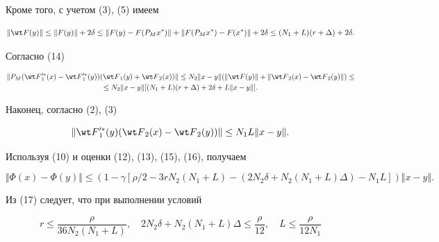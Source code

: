 Кроме того, с учетом (3), (5) имеем


\begin{equation}


\Vert {\wt F}(y) \Vert \leq \Vert F(y) \Vert+ 2\delta \leq


\Vert F(y)- F(P_M x^*) \Vert +


\Vert F(P_M x^*)-F(x^*) \Vert+


2\delta \leq (N_1+L)(r+\Delta)+ 2 \delta.


\end{equation}


Согласно (14)


\begin{multline}


\Vert P_M ({\wt F}{}_1^{\prime *}(x)- {\wt F}{}_1^{\prime *}(y))


({\wt F}_1 (y)+ {\wt F}_2 (x))\Vert \leq


N_2 \Vert x-y \Vert (\Vert {\wt F}(y) \Vert+


\Vert {\wt F}_2 (x) -{\wt F}_2 (y) \Vert) \leq \\


%


\leq N_2 \Vert x-y \Vert


[(N_1+L) (r+\Delta) + 2\delta+ L \Vert x-y \Vert].


\end{multline}


Наконец, согласно (2), (3)


\begin{equation}


\Vert{\wt F}{}_1^{\prime *}(y)


({\wt F}_2 (x)-{\wt F}_2 (y))


\Vert \leq N_1 L \Vert x-y \Vert.


\end{equation}


Используя (10) и оценки (12), (13), (15), (16), получаем


\begin{equation}


\Vert \Phi(x)- \Phi(y) \Vert \leq


(1-\gamma [\rho/2- 3 r N_2 (N_1 +L) -


(2 N_2 \delta + N_2 (N_1 + L) \Delta)-N_1 L]) \Vert x-y\Vert.


\end{equation}


Из (17) следует, что при выполнении условий


\begin{equation}


r \leq \frac{\rho}{36 N_2 (N_1 + L)}, \quad


2 N_2 \delta + N_2 (N_1+L) \Delta \leq \frac{\rho}{12},


\quad L\leq \frac{\rho}{12 N_1}


\end{equation}



